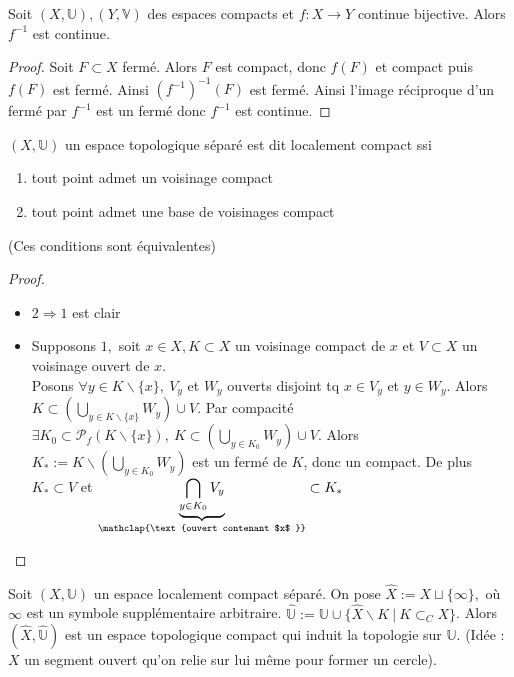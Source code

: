 \begin{corollaire}
    Soit $(X,\mathbb{U}),(Y,\mathbb{V})$ des espaces compacts et $f:X\to Y$ continue bijective. Alors $f^{-1} $ est continue.
\end{corollaire}
\begin{proof}
    Soit $F\subset X$ fermé. Alors $F$ est compact, donc $f(F)$ et compact puis $f(F)$ est fermé. Ainsi $\left( f^{-1}  \right) ^{-1} (F)$ est fermé. Ainsi l'image réciproque d'un fermé par $f^{-1} $ est un fermé donc $f^{-1} $ est continue.
\end{proof}
\begin{definition}
    $(X,\mathbb{U})$ un espace topologique séparé est dit localement compact ssi
   \begin{enumerate}
       \item tout point admet un voisinage compact
        \item tout point admet une base de voisinages compact
   \end{enumerate}
   (Ces conditions sont équivalentes)
\end{definition}
\begin{proof}\par\noindent
    \begin{itemize}
        \item $2\Rightarrow 1$ est clair
        \item Supposons $1,$ soit $x\in X,K\subset X$ un voisinage compact de $x$ et $V\subset X$ un voisinage ouvert de $x.$ \\
            Posons $\forall y\in K\backslash \{x\} ,\ V_y $ et $W_y$ ouverts disjoint tq $x\in V_y$ et $y\in W_y.$ Alors $K\subset \left( \bigcup\limits_{y\in K\backslash \{x\} }W_y  \right)\cup V $. 
            Par compacité $\exists K_0\subset \mathcal{P}_f (K\backslash \{x\}) ,\ K\subset \left( \bigcup\limits_{y\in K_0} W_y \right) \cup V$.
            Alors $K_*:=K\backslash \left( \bigcup\limits_{y\in K_0} W_y \right) $ est un fermé de $K$, donc un compact. De plus $K_*\subset V$ et $\underbrace{\bigcap\limits_{y\in K_0} V_y}_{\mathclap{\text{ouvert contenant $x$ }}}\subset K_*$
    \end{itemize}
\end{proof}
\begin{definition}
    Soit $(X,\mathbb{U})$ un espace localement compact séparé. On pose $\hat{X}:=X\sqcup \{\infty \} ,$ où $\infty $ est un symbole supplémentaire arbitraire. $\hat{\mathbb{U}}:=\mathbb{U}\cup \{\hat{X}\backslash K\ |\ K\subset _CX\}  $. Alors $(\hat{X},\hat{\mathbb{U}})$ est un espace topologique compact qui induit la topologie sur $\mathbb{U}.$ (Idée : $X$ un segment ouvert qu'on relie sur lui même pour former un cercle).
\end{definition}
